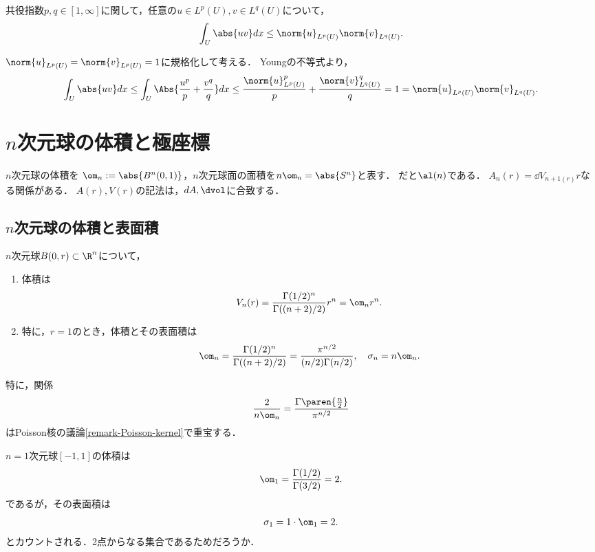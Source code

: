 \documentclass[uplatex,dvipdfmx]{jsreport}
\begin{document}
\begin{corollary}[Hölderの不等式]
    共役指数$p,q\in[1,\infty]$に関して，任意の$u\in L^p(U),v\in L^q(U)$について，
    \[\int_U\abs{uv}dx\le\norm{u}_{L^p(U)}\norm{v}_{L^q(U)}.\]
\end{corollary}
\begin{Proof}
    $\norm{u}_{L^p(U)}=\norm{v}_{L^p(U)}=1$に規格化して考える．
    Youngの不等式より，
    \[\int_U\abs{uv}dx\le\int_U\Abs{\frac{u^p}{p}+\frac{v^q}{q}}dx\le \frac{\norm{u}_{L^p(U)}^p}{p}+\frac{\norm{v}_{L^q(U)}^q}{q}=1=\norm{u}_{L^p(U)}\norm{v}_{L^q(U)}.\]
\end{Proof}

\section{$n$次元球の体積と極座標}

\begin{tcolorbox}[colframe=ForestGreen, colback=ForestGreen!10!white,breakable,colbacktitle=ForestGreen!40!white,coltitle=black,fonttitle=\bfseries\sffamily,
title=]
    $n$次元球の体積を
    $\om_n:=\abs{B^n(0,1)}$，$n$次元球面の面積を$n\om_n=\abs{S^n}$と表す．
    \cite{Evans}だと$\al(n)$である．
    $A_n(r)=\dd{V_{n+1(r)}}{r}$なる関係がある．
    $A(r),V(r)$の記法は，$dA,\dvol$に合致する．
\end{tcolorbox}

\subsection{$n$次元球の体積と表面積}

\begin{theorem}[球の体積]
    $n$次元球$B(0,r)\subset\R^n$について，
    \begin{enumerate}
        \item 体積は
        \[V_n(r)=\frac{\Gamma(1/2)^n}{\Gamma((n+2)/2)}r^n=\om_nr^n.\]
        \item 特に，$r=1$のとき，体積とその表面積は
        \[\om_n=\frac{\Gamma(1/2)^n}{\Gamma((n+2)/2)}=\frac{\pi^{n/2}}{(n/2)\Gamma(n/2)},\quad\sigma_n=n\om_n.\]
    \end{enumerate}
    特に，関係
    \[\frac{2}{n\om_n}=\frac{\Gamma\paren{\frac{n}{2}}}{\pi^{n/2}}\]
    はPoisson核の議論\ref{remark-Poisson-kernel}で重宝する．
\end{theorem}
\begin{remark}
    $n=1$次元球$[-1,1]$の体積は
    \[\om_1=\frac{\Gamma(1/2)}{\Gamma(3/2)}=2.\]
    であるが，その表面積は
    \[\sigma_1=1\cdot\om_1=2.\]
    とカウントされる．2点からなる集合であるためだろうか．
\end{remark}
\end{document}
